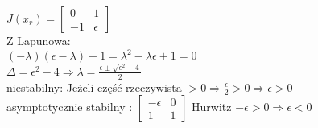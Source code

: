$J(x_r)= \left[ \begin{array}{cc}    0&1 \\-1 & \epsilon    \end{array}\right]$\\
Z Lapunowa:\\
$(- \lambda)(\epsilon - \lambda)+1 = \lambda^2 - \lambda \epsilon +1 = 0$\\
$\Delta = \epsilon^2-4 \Rightarrow \lambda =\frac{\epsilon \pm \sqrt{\epsilon^2-4}}{2}$\\
niestabilny: Jeżeli część rzeczywista $>0 \Rightarrow \frac{\epsilon}{2}>0 \Rightarrow \boxed{\epsilon >0}$\\
asymptotycznie stabilny : $\left[ \begin{array}{cc}    -\epsilon & 0 \\ 1 & 1   \end{array}\right]$ Hurwitz $-\epsilon>0 \Rightarrow \boxed{\epsilon<0}$\\



\pagebreak
